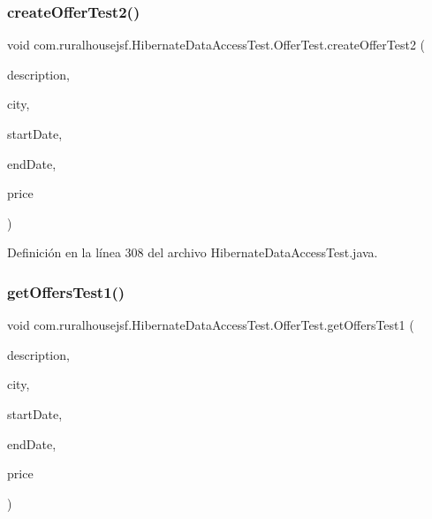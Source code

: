 \subsubsection{\texorpdfstring{createOfferTest2()}{createOfferTest2()}}
{\footnotesize\ttfamily void com.\+ruralhousejsf.\+Hibernate\+Data\+Access\+Test.\+Offer\+Test.\+create\+Offer\+Test2 (\begin{DoxyParamCaption}\item[{String}]{description,  }\item[{String}]{city,  }\item[{@Java\+Time\+Conversion\+Pattern(\char`\"{}dd/MM/yyyy\char`\"{}) Local\+Date}]{start\+Date,  }\item[{@Java\+Time\+Conversion\+Pattern(\char`\"{}dd/MM/yyyy\char`\"{}) Local\+Date}]{end\+Date,  }\item[{double}]{price }\end{DoxyParamCaption})\hspace{0.3cm}{\ttfamily [package]}}



Definición en la línea 308 del archivo Hibernate\+Data\+Access\+Test.\+java.

\mbox{\label{classcom_1_1ruralhousejsf_1_1_hibernate_data_access_test_1_1_offer_test_a5dc313dbb4fff4fd5e84b251acdddf05}} 
\subsubsection{\texorpdfstring{getOffersTest1()}{getOffersTest1()}}
{\footnotesize\ttfamily void com.\+ruralhousejsf.\+Hibernate\+Data\+Access\+Test.\+Offer\+Test.\+get\+Offers\+Test1 (\begin{DoxyParamCaption}\item[{String}]{description,  }\item[{String}]{city,  }\item[{@Java\+Time\+Conversion\+Pattern(\char`\"{}dd/MM/yyyy\char`\"{}) Local\+Date}]{start\+Date,  }\item[{@Java\+Time\+Conversion\+Pattern(\char`\"{}dd/MM/yyyy\char`\"{}) Local\+Date}]{end\+Date,  }\item[{double}]{price }\end{DoxyParamCaption})\hspace{0.3cm}{\ttfamily [package]}}



